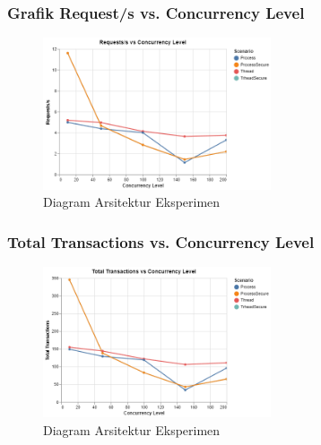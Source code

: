 \documentclass[12pt]{article}
\begin{document}
\subsubsection{Grafik Request/s vs. Concurrency Level}
\begin{figure}[h!]
 
    \includegraphics[width=0.6\textwidth]{res/request.png}
    \caption{Diagram Arsitektur Eksperimen}
    \label{fig:arch}
    \end{figure}

\subsubsection{Total Transactions vs. Concurrency Level}
\begin{figure}[h!]

\includegraphics[width=0.6\textwidth]{res/transaction.png}
\caption{Diagram Arsitektur Eksperimen}
\label{fig:arch}
\end{figure}
\end{document}
